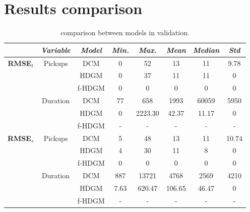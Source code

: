 \section{Results comparison}
\begin{table}[h!]
	\centering
	\renewcommand\arraystretch{1.3}
	\begin{tabular}{c|c|c|c|c|c|c|c}
		\hline
		\textit{} & \textit{Variable} & \textit{Model} & \textit{Min.} & \textit{Max.} & \textit{Mean} & \textit{Median} & \textit{Std}\\
		\hline
		\multirow{6}{4em}{\textbf{RMSE$_t$}} & \multirow{3}{4em}{Pickups} & DCM & \num{0} & \num{52} & \num{13} & \num{11} & \num{9.78} \\ \cline{3-8}
		& & HDGM & \num{0} & \num{37} & \num{11} & \num{11} & \num{0} \\ \cline{3-8}
		& & f-HDGM & \num{0} & \num{0} & \num{0} & \num{0} & \num{0} \\ \cline{2-8}
		& \multirow{3}{4em}{Duration} & DCM & \num{77} & \num{658} & \num{1993} & \num{60059} & \num{5950} \\ \cline{3-8} 
		& & HDGM & \num{0} & \num{2223.30} & \num{42.37} & \num{11.17} & \num{0} \\ \cline{3-8}
		& & f-HDGM & - & - & - & - & - \\
		\hline
		\multirow{6}{4em}{\textbf{RMSE$_s$}} & \multirow{3}{4em}{Pickups} & DCM & \num{5} & \num{48} & \num{13} & \num{11} & \num{10.74} \\ \cline{3-8}
		& & HDGM & \num{4} & \num{30} & \num{11} & \num{8} & \num{0} \\ \cline{3-8}
		& & f-HDGM & \num{0} & \num{0} & \num{0} & \num{0} & \num{0} \\ \cline{2-8}
		& \multirow{3}{4em}{Duration} & DCM & \num{887} & \num{13721} & \num{4768} & \num{2569} & \num{4210} \\ \cline{3-8} 
		& & HDGM & \num{7.63} & \num{620.47} & \num{106.65} & \num{46.47} & \num{0} \\ \cline{3-8}
		& & f-HDGM & - & - & - & - & - \\
		\hline
	\end{tabular}
	\caption[Comparison between models in validation]{comparison between models in validation.}
	\label{RMSE_HDGM_stats}
\end{table}

